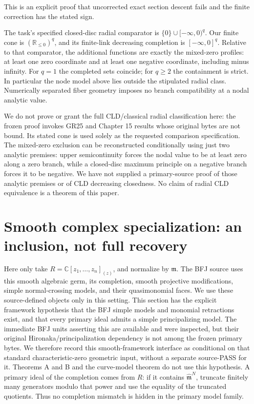 \documentclass[11pt]{article}
\begin{document}
This is an explicit proof that uncorrected exact section descent fails and the finite correction has the stated sign.

The task's specified closed-disc radial comparator is \(\{0\}\cup[-\infty,0)^q\). Our finite cone is \((\mathbb R_{\leq0})^q\), and its finite-link decreasing completion is \([-\infty,0]^q\). Relative to that comparator, the additional functions are exactly the mixed-zero profiles: at least one zero coordinate and at least one negative coordinate, including minus infinity. For \(q=1\) the completed sets coincide; for \(q\geq2\) the containment is strict. In particular the node model above lies outside the stipulated radial class. Numerically separated fiber geometry imposes no branch compatibility at a nodal analytic value.

We do not prove or grant the full CLD/classical radial classification here: the frozen proof invokes GR25 and Chapter 15 results whose original bytes are not bound. Its stated cone is used solely as the requested comparison specification. The mixed-zero exclusion can be reconstructed conditionally using just two analytic premises: upper semicontinuity forces the nodal value to be at least zero along a zero branch, while a closed-disc maximum principle on a negative branch forces it to be negative. We have not supplied a primary-source proof of those analytic premises or of CLD decreasing closedness. No claim of radial CLD equivalence is a theorem of this paper.

\section{Smooth complex specialization: an inclusion, not full recovery}

Here only take \(R=\mathbb C[z_1,\ldots,z_n]_{(z)}\), and normalize by \(\mathfrak m\). The BFJ source uses this smooth algebraic germ, its completion, smooth projective modifications, simple normal-crossing models, and their quasimonomial faces. We use these source-defined objects only in this setting. This section has the explicit framework hypothesis that the BFJ simple models and monomial retractions exist, and that every primary ideal admits a simple principalizing model. The immediate BFJ units asserting this are available and were inspected, but their original Hironaka/principalization dependency is not among the frozen primary bytes. We therefore record this smooth-framework interface as conditional on that standard characteristic-zero geometric input, without a separate source-PASS for it. Theorems A and B and the curve-model theorem do not use this hypothesis. A primary ideal of the completion comes from \(R\): if it contains \(\widehat{\mathfrak m}^N\), truncate finitely many generators modulo that power and use the equality of the truncated quotients. Thus no completion mismatch is hidden in the primary model family.
\end{document}
